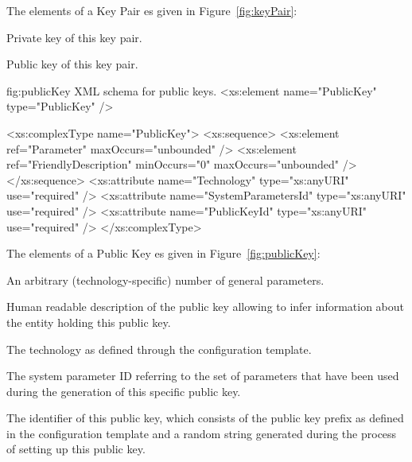 \vspace{3pt}\noindent The elements of a Key Pair es given in Figure~\ref{fig:keyPair}:
\begin{parameter}
Private key of this key pair.
\end{parameter}
\begin{parameter}
Public key of this key pair.
\end{parameter}



\begin{xml}
{fig:publicKey}
{XML schema for public keys.}
<xs:element name="PublicKey" type="PublicKey" />

<xs:complexType name="PublicKey">
  <xs:sequence>
    <xs:element ref="Parameter" maxOccurs="unbounded" />
    <xs:element ref="FriendlyDescription" minOccurs="0" maxOccurs="unbounded" />
  </xs:sequence>
  <xs:attribute name="Technology" type="xs:anyURI" use="required" />
  <xs:attribute name="SystemParametersId" type="xs:anyURI" use="required" />
  <xs:attribute name="PublicKeyId" type="xs:anyURI" use="required" />
</xs:complexType>
\end{xml}

\vspace{3pt}\noindent The elements of a Public Key es given in Figure~\ref{fig:publicKey}:
\begin{parameter}
An arbitrary (technology-specific) number of general parameters.
\end{parameter}
\begin{parameter}
Human readable description of the public key allowing to infer information about the entity holding
this public key.
\end{parameter}
\begin{parameter}
The technology as defined through the configuration template.
\end{parameter}
\begin{parameter}
The system parameter ID referring to the set of parameters that have been used during the generation
of this specific public key.
\end{parameter}
\begin{parameter}
The identifier of this public key, which consists of the public key prefix as defined in the 
configuration template and a random string generated during the process of setting up this public key.
\end{parameter}



